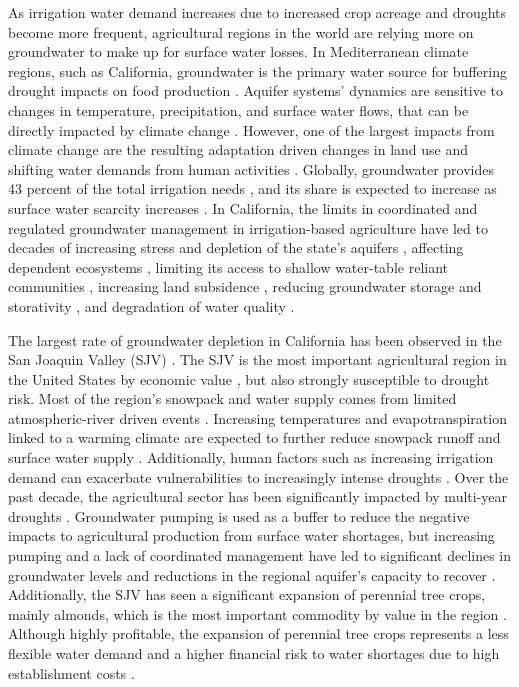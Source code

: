 \documentclass[a4paper,fleqn]{cas-sc}
\begin{document}
As irrigation water demand increases due to increased crop acreage and droughts become more frequent, agricultural regions in the world are relying more on groundwater to make up for surface water losses. In Mediterranean climate regions, such as California, groundwater is the primary water source for buffering drought impacts on food production \citep{malmgren_groundwater_2022,priyan_issues_2021}. Aquifer systems’ dynamics are sensitive to changes in temperature, precipitation, and surface water flows, that can be directly impacted by climate change \citep{cuthbert_global_2019,wu_divergent_2020}. However, one of the largest impacts from climate change are the resulting adaptation driven changes in land use and shifting water demands from human activities \citep{taylor_ground_2013}. Globally, groundwater provides 43 percent of the total irrigation needs \citep{siebert_groundwater_2010}, and its share is expected to increase as surface water scarcity increases \citep{bierkens_non-renewable_2019}. In California, the limits in coordinated and regulated groundwater management in irrigation-based agriculture have led to decades of increasing stress and depletion of the state's aquifers \citep{vasco_satellite-based_2019}, affecting dependent ecosystems \citep{bierkens_non-renewable_2019}, limiting its access to shallow water-table reliant communities \citep{pauloo_domestic_2020,perrone_dry_2017}, increasing land subsidence \citep{smith_groundwater_2020}, reducing groundwater storage and storativity \citep{alam_post-drought_2021}, and degradation of water quality \citep{levy_critical_2021}. 

The largest rate of groundwater depletion in California has been observed in the San Joaquin Valley (SJV) \citep{ojha_sustained_2018}. The SJV is the most important agricultural region in the United States by economic value \citep{usda_national_2020}, but also strongly susceptible to drought risk. Most of the region’s snowpack and water supply comes from limited atmospheric-river driven events \citep{espinoza_global_2018}. Increasing temperatures and evapotranspiration linked to a warming climate are expected to further reduce snowpack runoff and surface water supply \citep{fernandez-bou_regional_2021,vahmani_will_2022}. Additionally, human factors such as increasing irrigation demand can exacerbate vulnerabilities to increasingly intense droughts \citep{he_intensification_2017}. Over the past decade, the agricultural sector has been significantly impacted by multi-year droughts \citep{lund_lessons_2018,medellin-azuara_economic_2022}. Groundwater pumping is used as a buffer to reduce the negative impacts to agricultural production from surface water shortages, but increasing pumping and a lack of coordinated management have led to significant declines in groundwater levels and reductions in the regional aquifer's capacity to recover \citep{liu_groundwater_2022}.  Additionally, the SJV has seen a significant expansion of perennial tree crops, mainly almonds, which is the most important commodity by value in the region \citep{usda_national_2020}. Although highly profitable, the expansion of perennial tree crops represents a less flexible water demand and a higher financial risk to water shortages due to high establishment costs \citep{mall_water_2019,qin_flexibility_2019}.   
\end{document}
